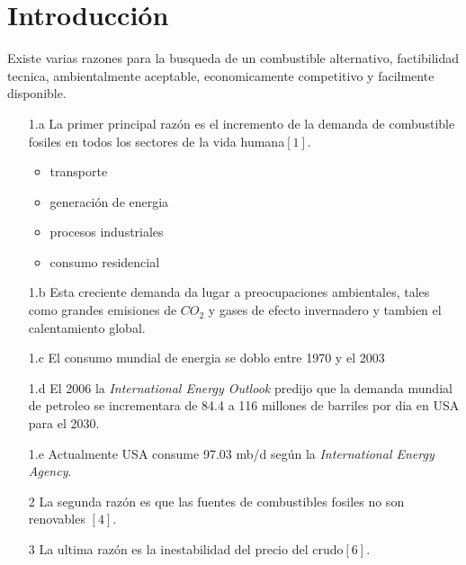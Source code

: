 \documentclass[a4paper,10pt]{article}
\begin{document}
\section{Introducción}
Existe varias razones para la busqueda de un combustible alternativo, factibilidad tecnica,
 ambientalmente aceptable, economicamente competitivo y facilmente disponible.
\begin{itemize}
 \item[1.a] La primer principal razón  es el incremento de la demanda de combustible fosiles en todos los sectores de la vida humana$[1]$.
    \begin{itemize}
	  \item transporte
	  \item generación de energia
	  \item procesos industriales
	  \item consumo residencial
    \end{itemize}
 \item[1.b] Esta creciente demanda da lugar a preocupaciones ambientales, tales como grandes 
  emisiones de $CO_2$ y gases de efecto invernadero y tambien el calentamiento global.
 \item[1.c] El consumo mundial de energia se doblo entre 1970 y el 2003
 \item[1.d] El 2006 la \emph{International Energy Outlook} predijo que la demanda mundial de petroleo 
  se incrementara de 84.4 a 116 millones de barriles por dia en USA para el 2030.
 \item[1.e] Actualmente USA consume 97.03 mb/d según la \emph{International Energy Agency}.
 \item[2] La segunda razón es que las fuentes de combustibles fosiles no son renovables $[4]$.
 \item[3] La ultima razón es la inestabilidad del precio del crudo$[6]$.
\end{itemize}
\end{document}
